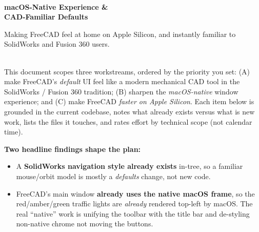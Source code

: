 \documentclass[11pt]{article}
\newcommand{\hairrule}{\vspace{2pt}{\color{hairline}\hrule height 0.6pt}\vspace{2pt}}
\newcommand{\eyebrow}[1]{{\footnotesize\color{appleblue}\bfseries\so{\MakeUppercase{#1}}}}
\newcommand{\trafficlights}{%
  \raisebox{0.2ex}{\textcolor{applered}{\Large\textbullet}}\,%
  \raisebox{0.2ex}{\textcolor{appleamber}{\Large\textbullet}}\,%
  \raisebox{0.2ex}{\textcolor{applegreen}{\Large\textbullet}}%
}
\begin{document}
\thispagestyle{fancy}

\begingroup
{}
\noindent\trafficlights\hfill\eyebrow{Product Scoping}\\[1.0em]
{\fontsize{29}{33}\selectfont\bfseries macOS-Native Experience \&\\ CAD-Familiar Defaults\par}
\vspace{0.7em}
{\large\color{applegray} Making FreeCAD feel at home on Apple Silicon, and instantly familiar to SolidWorks and Fusion 360 users.\par}
\vspace{1.1em}
\endgroup

\vspace{0.9em}
\hairrule
\vspace{1.3em}

\begin{tcolorbox}[enhanced, colback=panel, colframe=panel, boxrule=0pt,
  arc=6pt, left=16pt, right=16pt, top=12pt, bottom=12pt]
{\eyebrow{Summary}}\\[0.6em]
This document scopes three workstreams, ordered by the priority you set: (A) make
FreeCAD's \emph{default} UI feel like a modern mechanical CAD tool in the
SolidWorks / Fusion 360 tradition; (B) sharpen the \emph{macOS-native} window
experience; and (C) make FreeCAD \emph{faster on Apple Silicon}. Each item below is
grounded in the current codebase, notes what already exists versus what is new
work, lists the files it touches, and rates effort by technical scope (not
calendar time).

\vspace{0.6em}
\textbf{Two headline findings shape the plan:}
\begin{itemize}
  \item A \textbf{SolidWorks navigation style already exists} in-tree, so a familiar
  mouse/orbit model is mostly a \emph{defaults} change, not new code.
  \item FreeCAD's main window \textbf{already uses the native macOS frame}, so the
  red/amber/green traffic lights are \emph{already} rendered top-left by macOS. The
  real ``native'' work is unifying the toolbar with the title bar and de-styling
  non-native chrome \textemdash{} not moving the buttons.
\end{itemize}
\end{tcolorbox}
\end{document}
